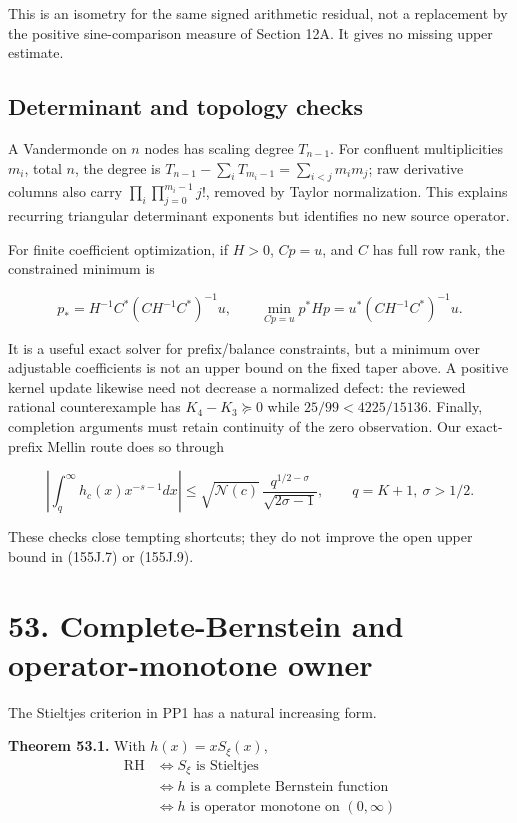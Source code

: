 \documentclass[
  11pt,
]{book}
\renewenvironment{quote}
  {\begin{tcolorbox}[
      enhanced,
      breakable,
      colback=tncream,
      colframe=tnrust,
      boxrule=0.8pt,
      arc=1.5pt,
      left=7pt,
      right=7pt,
      top=6pt,
      bottom=6pt]}
  {\end{tcolorbox}}
\begin{document}
This is an isometry for the same signed arithmetic residual, not a
replacement by the positive sine-comparison measure of Section 12A. It
gives no missing upper estimate.

\subsection{Determinant and topology
checks}\label{determinant-and-topology-checks}

A Vandermonde on \(n\) nodes has scaling degree \(T_{n-1}\). For
confluent multiplicities \(m_i\), total \(n\), the degree is
\(T_{n-1}-\sum_iT_{m_i-1}=\sum_{i<j}m_im_j\); raw derivative columns
also carry \(\prod_i\prod_{j=0}^{m_i-1}j!\), removed by Taylor
normalization. This explains recurring triangular determinant exponents
but identifies no new source operator.

For finite coefficient optimization, if \(H>0\), \(Cp=u\), and \(C\) has
full row rank, the constrained minimum is

\[
p_*=H^{-1}C^*(CH^{-1}C^*)^{-1}u,
\qquad
\min_{Cp=u}p^*Hp=u^*(CH^{-1}C^*)^{-1}u.
\tag{155J.11}
\]

It is a useful exact solver for prefix/balance constraints, but a
minimum over adjustable coefficients is not an upper bound on the fixed
taper above. A positive kernel update likewise need not decrease a
normalized defect: the reviewed rational counterexample has
\(K_4-K_3\succeq0\) while \(25/99<4225/15136\). Finally, completion
arguments must retain continuity of the zero observation. Our
exact-prefix Mellin route does so through

\[
\left|\int_q^\infty h_c(x)x^{-s-1}dx\right|
\le\sqrt{\mathscr N(c)}\,
\frac{q^{1/2-\sigma}}{\sqrt{2\sigma-1}},
\qquad q=K+1,\ \sigma>1/2.
\tag{155J.12}
\]

These checks close tempting shortcuts; they do not improve the open
upper bound in (155J.7) or (155J.9).

\section{53. Complete-Bernstein and operator-monotone
owner}\label{complete-bernstein-and-operator-monotone-owner}

The Stieltjes criterion in PP1 has a natural increasing form.

\begin{quote}
\textbf{Theorem 53.1.} With \(h(x)=xS_\xi(x)\), \[
\boxed{\begin{aligned}
\mathrm{RH}&\iff S_\xi\text{ is Stieltjes}\\
&\iff h\text{ is a complete Bernstein function}\\
&\iff h\text{ is operator monotone on }(0,\infty)
\end{aligned}}
\tag{53.1}
\]
\end{quote}
\end{document}
